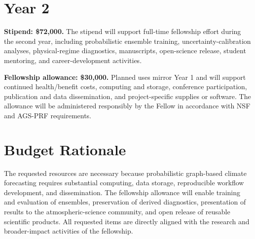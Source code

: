 \documentclass[11pt,letterpaper]{article}
\begin{document}
\section*{Year 2}
\textbf{Stipend: \$72,000.} The stipend will support full-time fellowship effort during the second year, including probabilistic ensemble training, uncertainty-calibration analyses, physical-regime diagnostics, manuscripts, open-science release, student mentoring, and career-development activities.

\textbf{Fellowship allowance: \$30,000.} Planned uses mirror Year 1 and will support continued health/benefit costs, computing and storage, conference participation, publication and data dissemination, and project-specific supplies or software. The allowance will be administered responsibly by the Fellow in accordance with NSF and AGS-PRF requirements.

\section*{Budget Rationale}
The requested resources are necessary because probabilistic graph-based climate forecasting requires substantial computing, data storage, reproducible workflow development, and dissemination. The fellowship allowance will enable training and evaluation of ensembles, preservation of derived diagnostics, presentation of results to the atmospheric-science community, and open release of reusable scientific products. All requested items are directly aligned with the research and broader-impact activities of the fellowship.
\end{document}
